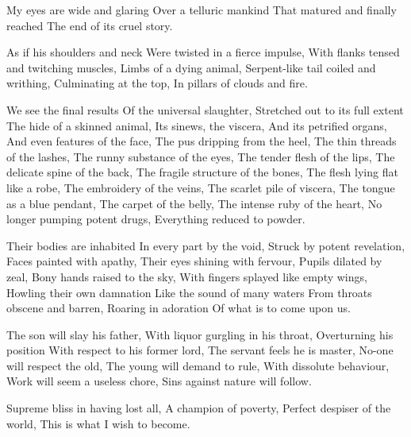 \documentclass{article}
\newenvironment{stanza}{\begin{minipage}{10cm}\obeylines}{\end{minipage}\vspace{\baselineskip}}
\begin{document}
\begin{stanza}
My eyes are wide and glaring
Over a telluric mankind
That matured and finally reached
The end of its cruel story.
\end{stanza}

\begin{stanza}
As if his shoulders and neck
Were twisted in a fierce impulse,
With flanks tensed and twitching muscles,
Limbs of a dying animal,
Serpent-like tail coiled and writhing,
Culminating at the top,
In pillars of clouds and fire.
\end{stanza}

\begin{stanza}
We see the final results
Of the universal slaughter,
Stretched out to its full extent
The hide of a skinned animal,
Its sinews, the viscera,
And its petrified organs,
And even features of the face,
The pus dripping from the heel,
The thin threads of the lashes,
The runny substance of the eyes,
The tender flesh of the lips,
The delicate spine of the back,
The fragile structure of the bones,
The flesh lying flat like a robe,
The embroidery of the veins,
The scarlet pile of viscera,
The tongue as a blue pendant,
The carpet of the belly,
The intense ruby of the heart,
No longer pumping potent drugs,
Everything reduced to powder.
\end{stanza}

\begin{stanza}
Their bodies are inhabited
In every part by the void,
Struck by potent revelation,
Faces painted with apathy,
Their eyes shining with fervour,
Pupils dilated by zeal,
Bony hands raised to the sky,
With fingers splayed like empty wings,
Howling their own damnation
Like the sound of many waters
From throats obscene and barren,
Roaring in adoration
Of what is to come upon us.
\end{stanza}

\begin{stanza}
The son will slay his father,
With liquor gurgling in his throat,
Overturning his position
With respect to his former lord,
The servant feels he is master,
No-one will respect the old,
The young will demand to rule,
With dissolute behaviour,
Work will seem a useless chore,
Sins against nature will follow.
\end{stanza}

\begin{stanza}
Supreme bliss in having lost all,
A champion of poverty,
Perfect despiser of the world,
This is what I wish to become.
\end{stanza}
\end{document}
